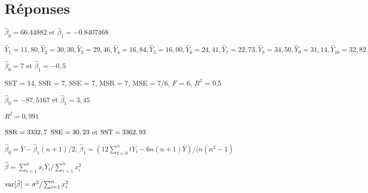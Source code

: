 \bigskip
\section*{Réponses}

\begin{reponse}{2.1}
    \begin{inparaenum}
    \item $\hat{\beta}_0=66.44882$ et $\hat{\beta}_1=-0.8407468$
    \item $\hat{Y}_1 = 11,80, \hat{Y}_2 = 30,30, \hat{Y}_3 = 29,46,
      \hat{Y}_4 = 16,84, \hat{Y}_5 = 16,00, \hat{Y}_6 = 24,41,
      \hat{Y}_7 = 22,73, \hat{Y}_8 = 34,50, \hat{Y}_9 = 31,14,
      \hat{Y}_{10} = 32,82$
    \end{inparaenum}
  
\end{reponse}
\begin{reponse}{2.2}
    \begin{inparaenum}
    \item $\hat{\beta}_0=7$ et $\hat{\beta}_1=-0,5$
    \item SST = 14, SSR = 7, SSE = 7, MSR = 7, MSE = 7/6, $F$ = 6, $R^2$ = 0,5
    \end{inparaenum}
  
\end{reponse}
\begin{reponse}{2.3}
    \begin{inparaenum}
    \item
      $\hat{\beta}_0 = -87,5167$
      et
      $\hat{\beta}_1 = 3,45$
    \item $R^2 = 0,991$
    \item
      $\mathrm{SSR} = 3332,7$
      $\mathrm{SSE} = 30,23$ et
      $\mathrm{SST} = 3362,93$
    \end{inparaenum}
  
\end{reponse}
\begin{reponse}{2.5}
    $\hat{\beta}_0 = \bar{Y} - \hat{\beta}_1 (n + 1)/2$,
    $\hat{\beta}_1 = (12 \sum_{t = 0}^n t Y_i - 6 n (n + 1)
    \bar{Y})/(n (n^2 - 1)$
  
\end{reponse}
\begin{reponse}{2.6}
    \begin{inparaenum}
    \item $\hat{\beta}= \sum_{i = 1}^n x_i Y_i/\sum_{i = 1}^n x_i^2$
    \item $\mathrm{var} [ \hat{\beta} ] = \sigma^2/\sum_{i = 1}^n x_i^2$
    \end{inparaenum}
  
\end{reponse}
